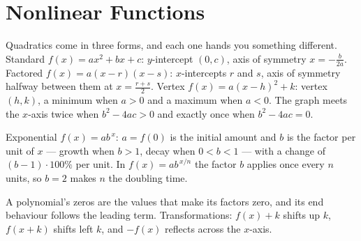 \chapter{Nonlinear Functions}

\begin{essentials}
Quadratics come in three forms, and each one hands you something different.
Standard $f(x)=ax^2+bx+c$: $y$-intercept $(0,c)$, axis of symmetry
$x=-\frac{b}{2a}$. Factored $f(x)=a(x-r)(x-s)$: $x$-intercepts $r$ and $s$,
axis of symmetry halfway between them at $x=\frac{r+s}{2}$. Vertex
$f(x)=a(x-h)^2+k$: vertex $(h,k)$, a minimum when $a>0$ and a maximum when
$a<0$. The graph meets the $x$-axis twice when $b^2-4ac>0$ and exactly once
when $b^2-4ac=0$.

Exponential $f(x)=ab^{\,x}$: $a=f(0)$ is the initial amount and $b$ is the
factor per unit of $x$ --- growth when $b>1$, decay when $0<b<1$ --- with a
change of $(b-1)\cdot 100\%$ per unit. In $f(x)=ab^{\,x/n}$ the factor $b$
applies once every $n$ units, so $b=2$ makes $n$ the doubling time.

A polynomial's zeros are the values that make its factors zero, and its end
behaviour follows the leading term. Transformations: $f(x)+k$ shifts up $k$,
$f(x+k)$ shifts left $k$, and $-f(x)$ reflects across the $x$-axis.
\end{essentials}

